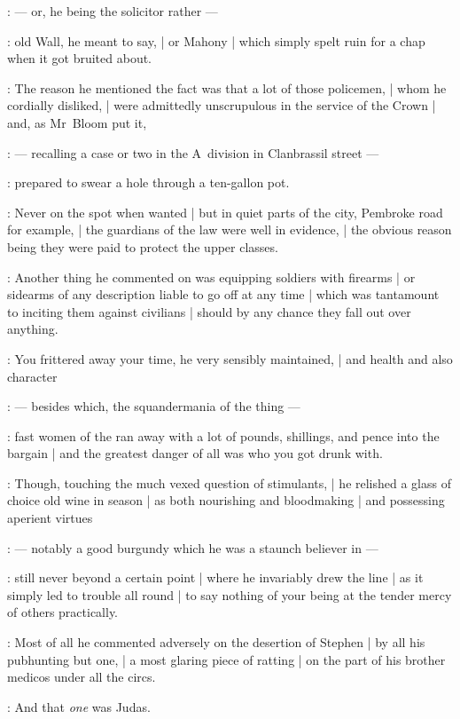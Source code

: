 :
    --- or, he being the solicitor rather ---

:
old Wall, he meant to say, |
or Mahony |
which simply spelt ruin for a chap when it got bruited about.

:
The reason he mentioned the fact was that a lot of those policemen, |
whom he cordially disliked, |
were admittedly unscrupulous in the service of the Crown |
and, as Mr~Bloom put it,

:
    --- recalling a case or two in the A~division in Clanbrassil street ---

:
prepared to swear a hole through a ten-gallon pot.

:
Never on the spot when wanted |
but in quiet parts of the city, Pembroke road for example, |
the guardians of the law were well in evidence, |
the obvious reason being they were paid to protect the upper classes.

:
Another thing he commented on was equipping soldiers with firearms |
or sidearms of any description liable to go off at any time |
which was tantamount to inciting them against civilians |
should by any chance they fall out over anything.

:
You frittered away your time, he very sensibly maintained, |
and health and also character

:
    --- besides which, the squandermania of the thing ---

:
fast women of the  ran away with
a lot of pounds, shillings, and pence into the bargain |
and the greatest danger of all was who you got drunk with.

:
Though, touching the much vexed question of stimulants, |
he relished a glass of choice old wine in season |
as both nourishing and bloodmaking |
and possessing aperient virtues

:
    --- notably a good burgundy which he was a staunch believer in ---

:
still never beyond a certain point |
where he invariably drew the line |
as it simply led to trouble all round |
to say nothing of your being at the tender mercy of others practically.

:
Most of all he commented adversely on the desertion of Stephen |
by all his pubhunting  but one, |
a most glaring piece of ratting |
on the part of his brother medicos under all the circs.

\Stephen:
And that \emph{one} was Judas.

